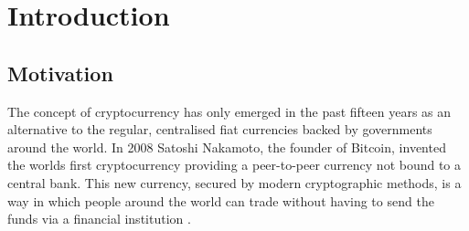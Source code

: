 \documentclass{l4proj}
\begin{document}
%
%
%
%
%
%
%
%
\chapter{Introduction}


\section{Motivation}

The concept of cryptocurrency has only emerged in the past fifteen years as an alternative to the regular,
centralised fiat currencies backed by governments around the world. In 2008 Satoshi Nakamoto, the 
founder of Bitcoin, invented the worlds first cryptocurrency providing a peer-to-peer currency
not bound to a central bank. This new currency, secured by modern cryptographic methods, is a way in
which people around the world can trade without having to send the funds via a financial institution \citep{narayanan2016bitcoin}.
\end{document}
